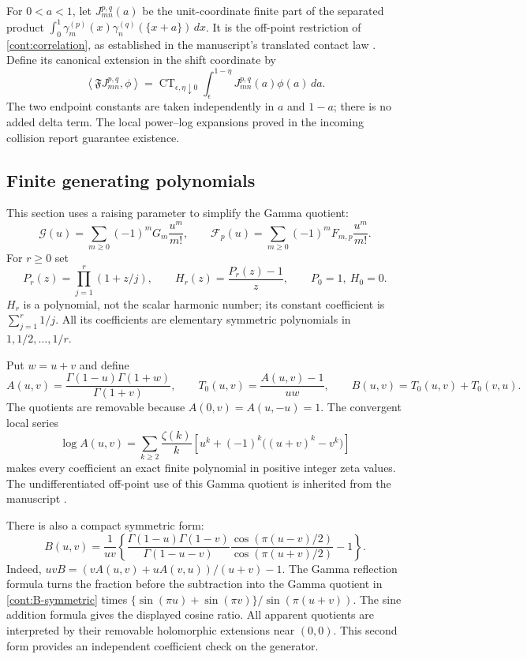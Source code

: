 \documentclass[11pt,a4paper]{article}
\theoremstyle{definition}
\theoremstyle{remark}
\DeclareMathOperator{\CT}{CT}
\numberwithin{equation}{section}
\begin{document}
For $0<a<1$, let $J_{mn}^{p,q}(a)$ be the unit-coordinate finite part
of the separated product
$\int_0^1\gamma_m^{(p)}(x)\gamma_n^{(q)}(\{x+a\})\,dx$.
It is the off-point restriction of \eqref{cont:correlation}, as
established in the manuscript's translated contact law
\cite{Repo}.  Define its canonical extension in the shift coordinate by
\begin{equation}\label{cont:shift-extension}
 \left\langle\mathfrak F J_{mn}^{p,q},\phi\right\rangle
 =\CT_{\epsilon,\eta\downarrow0}
      \int_\epsilon^{1-\eta}J_{mn}^{p,q}(a)\phi(a)\,da.
\end{equation}
The two endpoint constants are taken independently in $a$ and $1-a$;
there is no added delta term.  The local power--log expansions proved
in the incoming collision report guarantee existence.

\subsection{Finite generating polynomials}

This section uses a raising parameter to simplify the Gamma quotient:
\[
 \mathcal G(u)=\sum_{m\ge0}(-1)^mG_m\frac{u^m}{m!},
 \qquad \mathcal F_p(u)=\sum_{m\ge0}(-1)^mF_{m,p}\frac{u^m}{m!}.
\]
For $r\ge0$ set
\begin{equation}\label{cont:P-H}
 P_r(z)=\prod_{j=1}^r(1+z/j),\qquad
 H_r(z)=\frac{P_r(z)-1}{z},\qquad P_0=1,\ H_0=0.
\end{equation}
$H_r$ is a polynomial, not the scalar harmonic number; its constant
coefficient is $\sum_{j=1}^r1/j$.  All its coefficients are elementary
symmetric polynomials in $1,1/2,\ldots,1/r$.

Put $w=u+v$ and define
\begin{equation}\label{cont:A-B}
 A(u,v)=\frac{\Gamma(1-u)\Gamma(1+w)}{\Gamma(1+v)},
 \qquad T_0(u,v)=\frac{A(u,v)-1}{uw},
 \qquad B(u,v)=T_0(u,v)+T_0(v,u).
\end{equation}
The quotients are removable because $A(0,v)=A(u,-u)=1$.
The convergent local series
\begin{equation}\label{cont:log-A}
 \log A(u,v)=\sum_{k\ge2}\frac{\zeta(k)}{k}
       \left[u^k+(-1)^k\big((u+v)^k-v^k\big)\right]
\end{equation}
makes every coefficient an exact finite polynomial in positive
integer zeta values.  The undifferentiated off-point use of this
Gamma quotient is inherited from the manuscript \cite{Repo}.

There is also a compact symmetric form:
\begin{equation}\label{cont:B-symmetric}
 B(u,v)=\frac1{uv}\left\{
  \frac{\Gamma(1-u)\Gamma(1-v)}{\Gamma(1-u-v)}
  \frac{\cos(\pi(u-v)/2)}{\cos(\pi(u+v)/2)}-1\right\}.
\end{equation}
Indeed,
$uvB=(vA(u,v)+uA(v,u))/(u+v)-1$.
The Gamma reflection formula turns the fraction before the subtraction
into the Gamma quotient in \eqref{cont:B-symmetric} times
$\{\sin(\pi u)+\sin(\pi v)\}/\sin(\pi(u+v))$.
The sine addition formula gives the displayed cosine ratio. All
apparent quotients are interpreted by their removable holomorphic
extensions near $(0,0)$. This second form provides an independent
coefficient check on the generator.
\end{document}
